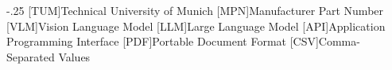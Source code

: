 \documentclass[headsepline,footsepline,footinclude=false,oneside,fontsize=11pt,paper=a4,listof=totoc,bibliography=totoc]{scrbook} %
\begin{document}


\frontmatter{}





\tableofcontents{}

\mainmatter{}












\appendix{}


\begin{acronym}
	\itemsep-.25\baselineskip
	[TUM]{Technical University of Munich}
	[MPN]{Manufacturer Part Number}
	[VLM]{Vision Language Model}
	[LLM]{Large Language Model}
	[API]{Application Programming Interface}
	[PDF]{Portable Document Format}
	[CSV]{Comma-Separated Values}
\end{acronym}

\listoffigures{}
\listoftables{}
\printbibliography{}
\end{document}
